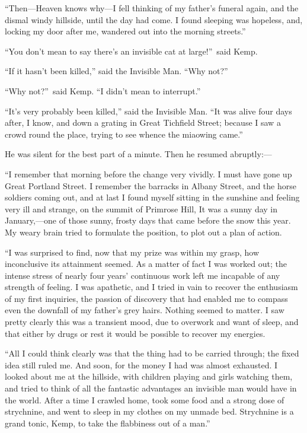 “Then—Heaven knows why—I fell thinking of my father’s funeral again, and the dismal windy hillside, until the day had come. I found sleeping was hopeless, and, locking my door after me, wandered out into the morning streets.”

“You don’t mean to say there’s an invisible cat at large!”\ said Kemp.

“If it hasn’t been killed,” said the Invisible Man. “Why not?”

“Why not?”\ said Kemp. “I didn’t mean to interrupt.”

“It’s very probably been killed,” said the Invisible Man. “It was alive four days after, I know, and down a grating in Great Tichfield Street; because I saw a crowd round the place, trying to see whence the miaowing came.”

He was silent for the best part of a minute. Then he resumed abruptly:—

“I remember that morning before the change very vividly. I must have gone up Great Portland Street. I remember the barracks in Albany Street, and the horse soldiers coming out, and at last I found myself sitting in the sunshine and feeling very ill and strange, on the summit of Primrose Hill, It was a sunny day in January,—one of those sunny, frosty days that came before the snow this year. My weary brain tried to formulate the position, to plot out a plan of action.

“I was surprised to find, now that my prize was within my grasp, how inconclusive its attainment seemed. As a matter of fact I was worked out; the intense stress of nearly four years’ continuous work left me incapable of any strength of feeling. I was apathetic, and I tried in vain to recover the enthusiasm of my first inquiries, the passion of discovery that had enabled me to compass even the downfall of my father’s grey hairs. Nothing seemed to matter. I saw pretty clearly this was a transient mood, due to overwork and want of sleep, and that either by drugs or rest it would be possible to recover my energies.

“All I could think clearly was that the thing had to be carried through; the fixed idea still ruled me. And soon, for the money I had was almost exhausted. I looked about me at the hillside, with children playing and girls watching them, and tried to think of all the fantastic advantages an invisible man would have in the world. After a time I crawled home, took some food and a strong dose of strychnine, and went to sleep in my clothes on my unmade bed. Strychnine is a grand tonic, Kemp, to take the flabbiness out of a man.”


